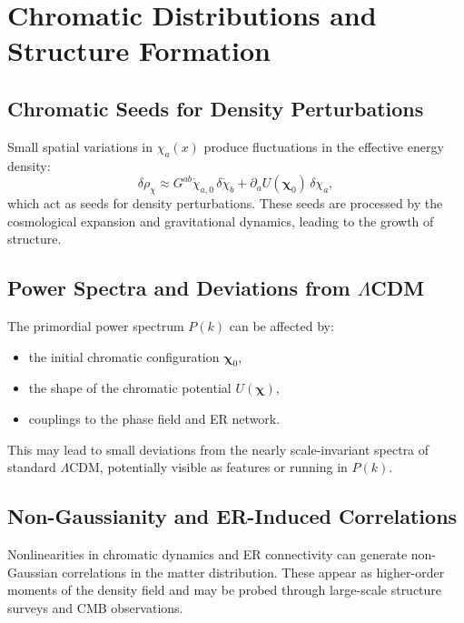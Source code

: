 \chapter{Chromatic Distributions and Structure Formation}

\section{Chromatic Seeds for Density Perturbations}

Small spatial variations in $\chi_a(x)$ produce fluctuations in the effective energy density:
\[
  \delta \rho_\chi \approx G^{ab}\dot{\chi}_{a,0}\,\delta\dot{\chi}_b + \partial_a U(\bm{\chi}_0)\,\delta\chi_a,
\]
which act as seeds for density perturbations.
These seeds are processed by the cosmological expansion and gravitational dynamics, leading to the growth of structure.

\section{Power Spectra and Deviations from \texorpdfstring{$\Lambda$}{Lambda}CDM}

The primordial power spectrum $P(k)$ can be affected by:
\begin{itemize}
  \item the initial chromatic configuration $\bm{\chi}_0$,
  \item the shape of the chromatic potential $U(\bm{\chi})$,
  \item couplings to the phase field and ER network.
\end{itemize}
This may lead to small deviations from the nearly scale-invariant spectra of standard $\Lambda$CDM, potentially visible as features or running in $P(k)$.

\section{Non-Gaussianity and ER-Induced Correlations}

Nonlinearities in chromatic dynamics and ER connectivity can generate non-Gaussian correlations in the matter distribution.
These appear as higher-order moments of the density field and may be probed through large-scale structure surveys and CMB observations.

